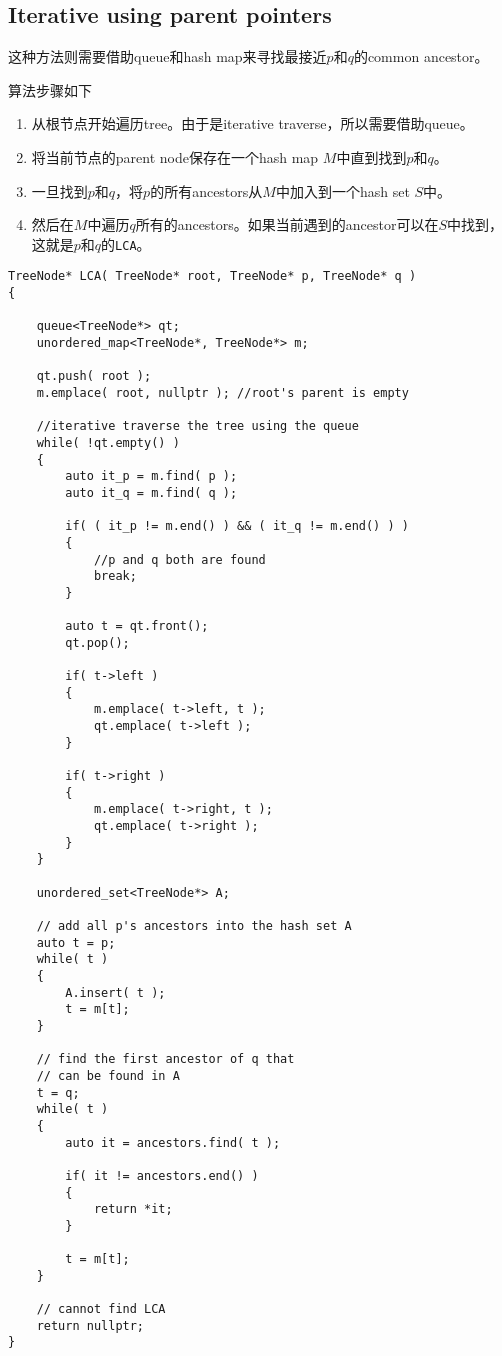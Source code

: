 \subsection{Iterative using parent pointers}
\begin{CJK*}{UTF8}{gbsn}
这种方法则需要借助queue和hash map来寻找最接近$p$和$q$的common ancestor。
\par
算法步骤如下
\begin{enumerate}
\item 从根节点开始遍历tree。由于是iterative traverse，所以需要借助queue。
\item 将当前节点的parent node保存在一个hash map $M$中直到找到$p$和$q$。
\item 一旦找到$p$和$q$，将$p$的所有ancestors从$M$中加入到一个hash set $S$中。
\item 然后在$M$中遍历$q$所有的ancestors。如果当前遇到的ancestor可以在$S$中找到，这就是$p$和$q$的\texttt{LCA}。
\end{enumerate}
\end{CJK*}
\begin{lstlisting}[style=customc, caption={Iterative Searching}]
TreeNode* LCA( TreeNode* root, TreeNode* p, TreeNode* q )
{

    queue<TreeNode*> qt;
    unordered_map<TreeNode*, TreeNode*> m;

    qt.push( root );
    m.emplace( root, nullptr ); //root's parent is empty

    //iterative traverse the tree using the queue
    while( !qt.empty() )
    {
        auto it_p = m.find( p );
        auto it_q = m.find( q );

        if( ( it_p != m.end() ) && ( it_q != m.end() ) )
        {
            //p and q both are found
            break;
        }

        auto t = qt.front();
        qt.pop();

        if( t->left )
        {
            m.emplace( t->left, t );
            qt.emplace( t->left );
        }

        if( t->right )
        {
            m.emplace( t->right, t );
            qt.emplace( t->right );
        }
    }

    unordered_set<TreeNode*> A;

    // add all p's ancestors into the hash set A
    auto t = p;
    while( t )
    {
        A.insert( t );
        t = m[t];
    }

    // find the first ancestor of q that
    // can be found in A
    t = q;
    while( t )
    {
        auto it = ancestors.find( t );

        if( it != ancestors.end() )
        {
            return *it;
        }

        t = m[t];
    }

    // cannot find LCA
    return nullptr;
}
\end{lstlisting}
